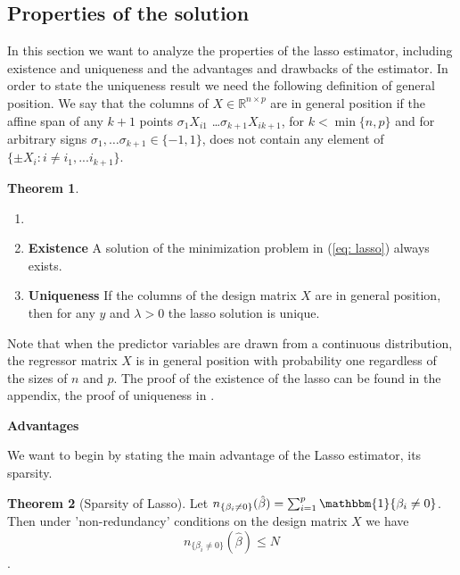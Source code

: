 \documentclass{article}
\theoremstyle{definition}
\newtheorem{theorem}{Theorem}
\begin{document}
\subsection{Properties of the solution}

In this section we want to analyze the properties of the lasso estimator, including existence and uniqueness and the advantages and drawbacks of the estimator. In order to state the uniqueness result we need the following definition of general position. We say that the columns of $X \in \mathbb{R}^{n\times p}$ are in general position if the affine span of any $k+1$ points $\sigma_1X_{i1}$ \ldots $\sigma_{k+1}X_{ik+1}$, for $k < \min \{n,p\}$ and for arbitrary signs $\sigma_1, \ldots \sigma_{k+1} \in \{-1,1\}$, does not contain any element of $\{\pm X_i:i\neq i_1, . . . i_{k+1} \}$. 

\begin{theorem}
	\begin{enumerate}
		\item []
		\item \textbf{Existence} A solution of the minimization problem in (\ref{eq: lasso}) always exists.
		\item \textbf{Uniqueness} \citep{tibshirani2013lasso} If the columns of the design matrix $X$ are in general position, then for any $y$ and $\lambda > 0$ the lasso solution is unique.
	\end{enumerate}

\bigskip
Note that when the predictor variables are drawn from a continuous distribution, the regressor matrix $X$ is in general position with probability one regardless of the sizes of $n$ and $p$.
\noindent The proof of the existence of the lasso can be found in the appendix, the proof of uniqueness in \citep{tibshirani2013lasso}.
	
\end{theorem}

\noindent\textbf{Advantages}

\noindent We want to begin by stating the main advantage of the Lasso estimator, its sparsity.

\begin{theorem}[Sparsity of Lasso] \label{theo: sparsity_lasso}
	Let $n_{\{\beta_i\neq 0\}}(\hat{\beta}) = \sum_{i=1}^{p} \mathbbm{1} \{\beta_i \neq 0\}$.
	Then under 'non-redundancy' conditions on the design matrix $X$ we have 
	\begin{equation}
		n_{\{\beta_i\neq 0\}}(\hat{\beta}) \leq N
	\end{equation}.
\end{theorem}
\end{document}
